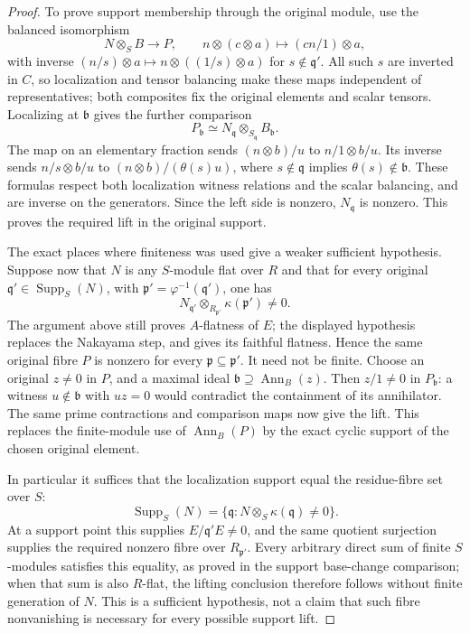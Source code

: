 \begin{proof}
To prove support membership through the original
module, use the balanced isomorphism
$$
N\otimes_SB\longrightarrow P,
\qquad n\otimes(c\otimes a)\longmapsto(cn/1)\otimes a,
$$
with inverse $(n/s)\otimes a\mapsto
n\otimes((1/s)\otimes a)$ for $s\notin\mathfrak q'$.
All such $s$ are inverted in $C$, so localization
and tensor balancing make these maps independent
of representatives; both composites fix the
original elements and scalar tensors. Localizing
at $\mathfrak b$ gives the further comparison
$$
P_{\mathfrak b}\simeq
N_{\mathfrak q}\otimes_{S_{\mathfrak q}}B_{\mathfrak b}.
$$
The map on an elementary fraction sends
$(n\otimes b)/u$ to $n/1\otimes b/u$.
Its inverse sends $n/s\otimes b/u$ to
$(n\otimes b)/(\theta(s)u)$, where
$s\notin\mathfrak q$ implies
$\theta(s)\notin\mathfrak b$. These formulas
respect both localization witness relations and
the scalar balancing, and are inverse on the
generators. Since the left side is nonzero,
$N_{\mathfrak q}$ is nonzero. This proves the
required lift in the original support.

\medskip\noindent
The exact places where finiteness was used give
a weaker sufficient hypothesis. Suppose now that
$N$ is any $S$-module flat over $R$ and that for
every original $\mathfrak q'\in\operatorname{Supp}_S(N)$,
with $\mathfrak p'=\varphi^{-1}(\mathfrak q')$, one has
$$
N_{\mathfrak q'}\otimes_{R_{\mathfrak p'}}
\kappa(\mathfrak p')\ne0.
$$
The argument above still proves $A$-flatness of
$E$; the displayed hypothesis replaces the
Nakayama step, and gives its faithful flatness.
Hence the same original fibre $P$ is nonzero
for every $\mathfrak p\subseteq\mathfrak p'$.
It need not be finite. Choose an original
$z\ne0$ in $P$, and a maximal ideal
$\mathfrak b\supseteq\operatorname{Ann}_B(z)$.
Then $z/1\ne0$ in $P_{\mathfrak b}$: a witness
$u\notin\mathfrak b$ with $uz=0$ would contradict
the containment of its annihilator. The same
prime contractions and comparison maps now give
the lift. This replaces the finite-module use
of $\operatorname{Ann}_B(P)$ by the exact cyclic
support of the chosen original element.

In particular it suffices that the localization
support equal the residue-fibre set over $S$:
$$
\operatorname{Supp}_S(N)
=\{\mathfrak q:N\otimes_S\kappa(\mathfrak q)\ne0\}.
$$
At a support point this supplies
$E/\mathfrak q'E\ne0$, and the same quotient
surjection supplies the required nonzero fibre
over $R_{\mathfrak p'}$. Every arbitrary direct
sum of finite $S$-modules satisfies this equality,
as proved in the support base-change comparison;
when that sum is also $R$-flat, the lifting
conclusion therefore follows without finite
generation of $N$. This is a sufficient hypothesis,
not a claim that such fibre nonvanishing is
necessary for every possible support lift.


\end{proof}
